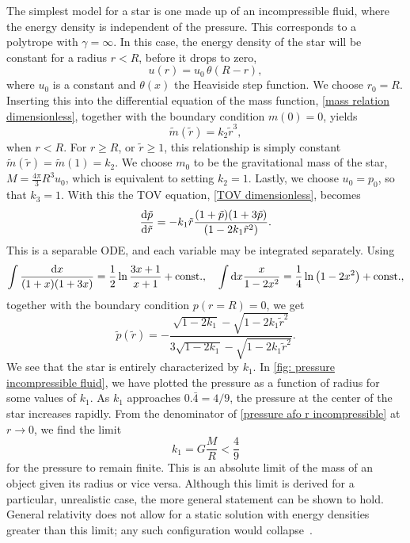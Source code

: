 The simplest model for a star is one made up of an incompressible fluid, where the energy density is independent of the pressure.
This corresponds to a polytrope with $\gamma = \infty$.
In this case, the energy density of the star will be constant for a radius $r < R$, before it drops to zero,
%
\begin{equation}
    u(r) = u_0 \, \theta (R- r),
\end{equation}
%
where $u_0$ is a constant and $\theta(x)$ the Heaviside step function.
We choose $r_0 = R$.
Inserting this into the differential equation of the mass function, \autoref{mass relation dimensionless}, together with the boundary condition $m(0) = 0$, yields
%
\begin{equation}
    \tilde m(\tilde r) = k_2 \tilde r^3,
\end{equation}
%
when $r < R$.
For $r \geq R$, or $\tilde r \geq 1$, this relationship is simply constant $\tilde m(\tilde r) = \tilde m(1) = k_2$.
We choose $m_0$ to be the gravitational mass of the star, $M = \frac{4 \pi }{3} R^3 u_0$, which is equivalent to setting $k_2 = 1$.
Lastly, we choose $u_0 = p_0$, so that $k_3 = 1$.
With this the TOV equation, \autoref{TOV dimensionless}, becomes
%
\begin{equation} 
    \odv{\tilde p}{\tilde r} 
    = - k_1 \tilde r 
    \frac{(1 + \tilde p)(1 + 3 \tilde p)}{(1 - 2 k_1 \tilde r^2)}.
\end{equation}
%
This is a separable ODE, and each variable may be integrated separately.
Using
%
\begin{align}
    \int \frac{\text{d} x}{(1 + x)(1 + 3x)}
    = \frac{1}{2} \ln \frac{3x + 1}{x + 1} + \mathrm{const.} , \quad
    \int \text{d} x \frac{x}{1 - 2 x^2} 
    = \frac{1}{4}\ln\left(1 - 2 x^2 \right)
    + \mathrm{const.},
\end{align}
%
together with the boundary condition $p(r = R) = 0$, we get 
%
\begin{equation}
    \label{pressure afo r incompressible}
    \tilde p(\tilde r) 
    = 
    - \frac{\sqrt{1 - 2 k_1} - \sqrt{1 - 2 k_1 \tilde r^2}}
    {3 \sqrt{1 - 2 k_1 } - \sqrt{1 - 2 k_1 \tilde r^2}}.
\end{equation}
%
We see that the star is entirely characterized by $k_1$.
In \autoref{fig: pressure incompressible fluid}, we have plotted the pressure as a function of radius for some values of $k_1$.
As $k_1$ approaches $0.\bar 4 = 4/9$, the pressure at the center of the star increases rapidly.
From the denominator of \autoref{pressure afo r incompressible} at $r\rightarrow 0$, we find the limit
%
\begin{equation}
    \label{mass radius constraint}
    k_1 = G \frac{M}{R} < \frac{4}{9}
\end{equation}
%
for the pressure to remain finite.
This is an absolute limit of the mass of an object given its radius or vice versa.
Although this limit is derived for a particular, unrealistic case, the more general statement can be shown to hold.
General relativity does not allow for a static solution with energy densities greater than this limit; any such configuration would collapse~\autocite{carrollSpacetimeGeometryIntroduction2019}.

